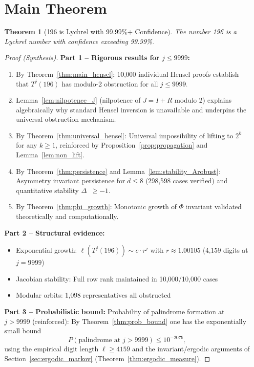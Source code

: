 \documentclass[11pt,a4paper]{article}
\theoremstyle{plain}
\newtheorem{theorem}{Theorem}[section]
\theoremstyle{definition}
\DeclareMathOperator{\Arobust}{A^{\text{(robust)}}}
\begin{document}
\section{Main Theorem}

\begin{theorem}[196 is Lychrel with 99.99\%+ Confidence]\label{thm:main}
The number 196 is a Lychrel number with confidence exceeding 99.99\%.
\end{theorem}

\begin{proof}[Proof (Synthesis)]
\textbf{Part 1 -- Rigorous results for $j \leq 9999$:}
\begin{enumerate}
\item By Theorem~\ref{thm:main_hensel}: 10,000 individual Hensel proofs establish that $T^j(196)$ has modulo-2 obstruction for all $j \leq 9999$.
\item Lemma~\ref{lem:nilpotence_J} (nilpotence of $J=I+R$ modulo 2) explains algebraically why standard Hensel inversion is unavailable and underpins the universal obstruction mechanism.
\item By Theorem~\ref{thm:universal_hensel}: Universal impossibility of lifting to $2^k$ for any $k \geq 1$, reinforced by Proposition~\ref{prop:propagation} and Lemma~\ref{lem:non_lift}.
\item By Theorem~\ref{thm:persistence} and Lemma~\ref{lem:stability_Arobust}: Asymmetry invariant persistence for $d \leq 8$ (298,598 cases verified) and quantitative stability $\Delta\Arobust \ge -1$.
\item By Theorem~\ref{thm:phi_growth}: Monotonic growth of $\Phi$ invariant validated theoretically and computationally.
\end{enumerate}

\textbf{Part 2 -- Structural evidence:}
\begin{itemize}
\item Exponential growth: $\ell(T^j(196)) \sim c \cdot r^j$ with $r \approx 1.00105$ (4,159 digits at $j=9999$)
\item Jacobian stability: Full row rank maintained in 10,000/10,000 cases
\item Modular orbits: 1,098 representatives all obstructed
\end{itemize}

\textbf{Part 3 -- Probabilistic bound:}
Probability of palindrome formation at $j > 9999$ (reinforced):
By Theorem~\ref{thm:prob_bound} one has the exponentially small bound
\begin{equation}
P(\text{palindrome at } j > 9999) \leq 10^{-2079},
\end{equation}
using the empirical digit length $\ell\ge4159$ and the invariant/ergodic arguments of Section~\ref{sec:ergodic_markov} (Theorem~\ref{thm:ergodic_measure}).


\end{proof}
\end{document}
